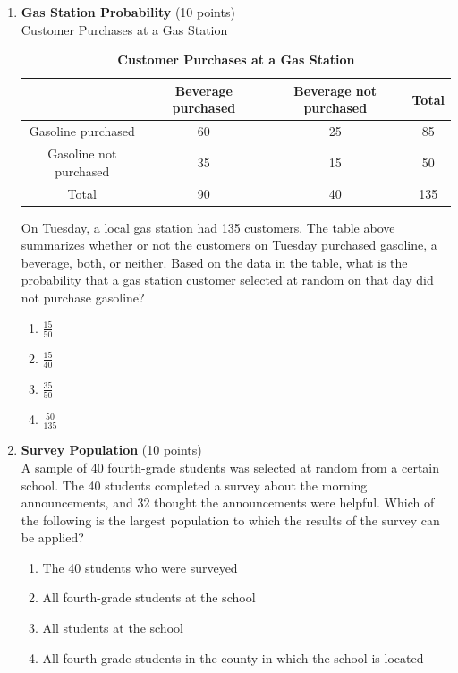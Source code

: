 \begin{enumerate}
  \item \textbf{Gas Station Probability} (10 points)\\
  Customer Purchases at a Gas Station
  \begin{table}[h!]
  \centering
  \renewcommand{\arraystretch}{1.3}
  \setlength{\tabcolsep}{8pt}
  \caption*{\textbf{Customer Purchases at a Gas Station}}
  \begin{tabular}{|c|c|c|c|}
  \hline
  \rowcolor[HTML]{E0E0E0}
   & \textbf{Beverage purchased} & \textbf{Beverage not purchased} & \textbf{Total} \\
  \hline
  Gasoline purchased & 60 & 25 & 85 \\
  \hline
  Gasoline not purchased & 35 & 15 & 50 \\
  \hline
  Total & 90 & 40 & 135 \\
  \hline
  \end{tabular}
  \end{table}
  On Tuesday, a local gas station had 135 customers. The table above summarizes whether or not the customers on Tuesday purchased gasoline, a beverage, both, or neither. Based on the data in the table, what is the probability that a gas station customer selected at random on that day did not purchase gasoline?
  \begin{enumerate}[label=(\Alph*)]
    \item $\frac{15}{50}$
    \item $\frac{15}{40}$
    \item $\frac{35}{50}$
    \item $\frac{50}{135}$
  \end{enumerate}
  \begin{subanswer}
  \end{subanswer}

  \item \textbf{Survey Population} (10 points)\\
  A sample of 40 fourth-grade students was selected at random from a certain school. The 40 students completed a survey about the morning announcements, and 32 thought the announcements were helpful. Which of the following is the largest population to which the results of the survey can be applied?
  \begin{enumerate}[label=(\Alph*)]
    \item The 40 students who were surveyed
    \item All fourth-grade students at the school
    \item All students at the school
    \item All fourth-grade students in the county in which the school is located
  \end{enumerate}
  \begin{subanswer}
  \end{subanswer}


\end{enumerate}

